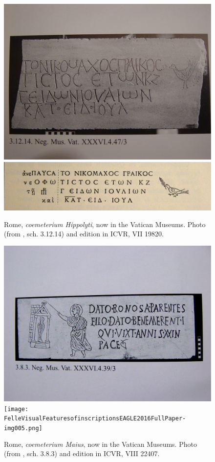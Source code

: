 \documentclass[amsthm,ebook]{saparticle}
\begin{document}
\begin{figure}[!hbp]
\centering
 \includegraphics[width=\columnwidth]{FelleVisualFeaturesofinscriptionsEAGLE2016FullPaper-img002.jpg}
 \includegraphics[width=\columnwidth]{FelleVisualFeaturesofinscriptionsEAGLE2016FullPaper-img003.png}
\caption{Rome, \emph{coemeterium Hippolyti}, now in the Vatican Museums. Photo (from \citealp{Manzella1997Felle}, sch. 3.12.14) and
edition in ICVR, VII 19820.}
\label{fig:3}
\end{figure}




\begin{figure}[!hbp]
\centering
 \includegraphics[width=\columnwidth]{FelleVisualFeaturesofinscriptionsEAGLE2016FullPaper-img004.png}
  \texttt{[image: FelleVisualFeaturesofinscriptionsEAGLE2016FullPaper-img005.png]}

\caption{Rome, \emph{coemeterium Maius}, now in the Vatican Museums. Photo (from \citealp{Manzella1997Felle}, sch. 3.8.3) and edition in
ICVR, VIII 22407.}
\label{fig:4}
\end{figure}
\end{document}
